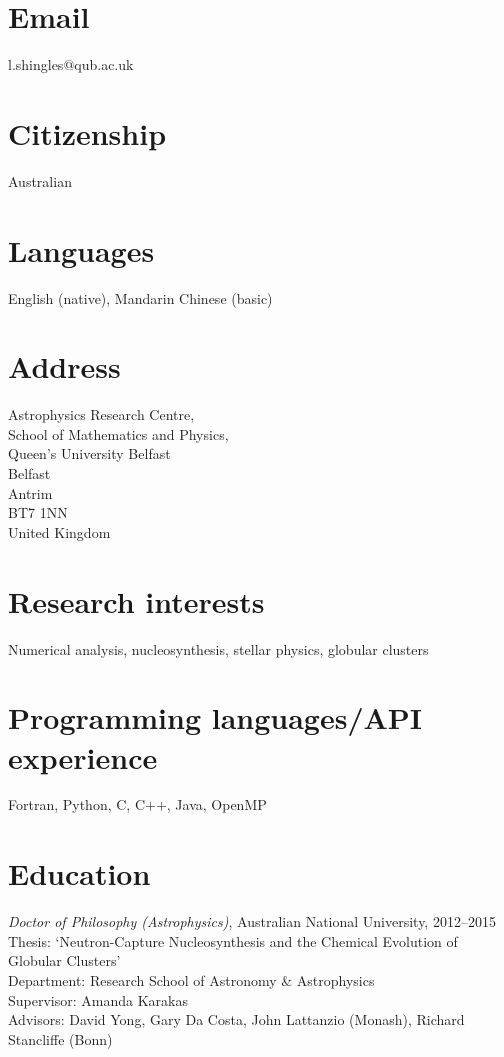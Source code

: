 \documentclass[11pt]{res} %
\begin{document}

\begin{resume}

\section{Email}
  l.shingles@qub.ac.uk


\section{Citizenship}
  Australian

\section{Languages}
  English (native), Mandarin Chinese (basic)

\section{Address}
  Astrophysics Research Centre,\\
  School of Mathematics and Physics,\\
  Queen's University Belfast\\
  Belfast\\
  Antrim\\
  BT7 1NN\\
  United Kingdom

\section{Research interests}
   Numerical analysis, nucleosynthesis, stellar physics, globular clusters

\section{Programming languages/API experience}
  Fortran, Python, C, C++, Java, OpenMP

\section{Education}
  {\it Doctor of Philosophy (Astrophysics)}, Australian National University, 2012--2015\\
  Thesis: `Neutron-Capture Nucleosynthesis and the Chemical Evolution of Globular Clusters'\\
  Department: Research School of Astronomy \& Astrophysics\\
  Supervisor: Amanda Karakas\\
  Advisors: David Yong, Gary Da Costa, John Lattanzio (Monash), Richard Stancliffe (Bonn)


\end{resume}
\end{document}
